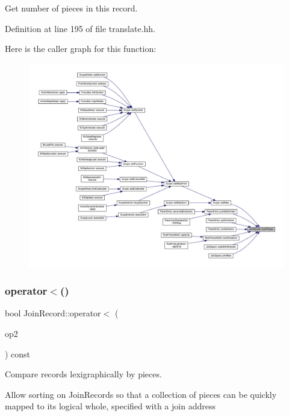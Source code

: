 Get number of pieces in this record. 



Definition at line 195 of file translate.\+hh.

Here is the caller graph for this function\+:
\nopagebreak
\begin{figure}[H]
\begin{center}
\leavevmode
\includegraphics[width=350pt]{class_join_record_a18d9eb13c87a49511865fab244aa69f5_icgraph}
\end{center}
\end{figure}
\mbox{\label{class_join_record_a2e6ea7f4592e991ee9c7e72b9c99307d}} 
\subsubsection{\texorpdfstring{operator$<$()}{operator<()}}
{\footnotesize\ttfamily bool Join\+Record\+::operator$<$ (\begin{DoxyParamCaption}\item[{const \mbox{\hyperlink{class_join_record}{Join\+Record}} \&}]{op2 }\end{DoxyParamCaption}) const}



Compare records lexigraphically by pieces. 

Allow sorting on Join\+Records so that a collection of pieces can be quickly mapped to its logical whole, specified with a join address 

